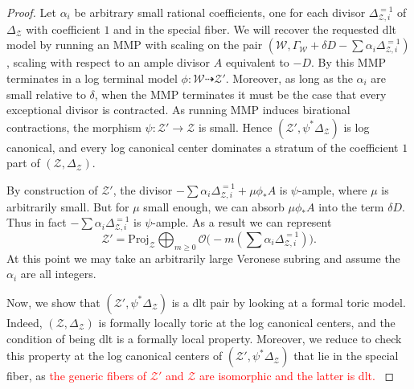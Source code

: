 \documentclass{amsart}%
\numberwithin{equation}{subsection}
\theoremstyle{plain2}
\theoremstyle{definition2}
\theoremstyle{stepstyle}
\theoremstyle{point}
\theoremstyle{subpoint}
\newcommand{\cZ}{\ensuremath{\mathscr{Z}}}
\newcommand{\cW}{\ensuremath{\mathscr{W}}}
\begin{document}
\begin{proof}
Let $\alpha_i$ be arbitrary small rational coefficients, one for each divisor $\Delta_{\cZ,i}^{=1}$ of $\Delta_\cZ$ with coefficient $1$ and in the special fiber. We will recover the requested dlt model by running an MMP with scaling on the pair $(\cW, \Gamma_\cW+\delta D - \sum \alpha_i \Delta_{\cZ,i}^{=1})$, scaling with respect to an ample divisor $A$ equivalent to $-D$. By \cite{BirkarCasciniHaconEtAl} this MMP terminates in a log terminal model $\phi \colon \cW \dashrightarrow \cZ'$. Moreover, as long as the $\alpha_i$ are small relative to $\delta$, when the MMP terminates it must be the case that every exceptional divisor is contracted.  As running MMP induces birational contractions, the morphism $\psi \colon \cZ' \to \cZ$ is small. Hence $(\cZ', \psi^*\Delta_\cZ)$ is log canonical, and every log canonical center dominates a stratum of the coefficient $1$ part of $(\cZ,\Delta_\cZ)$.

By construction of $\cZ'$, the divisor $-\sum \alpha_i \Delta_{\cZ,i}^{=1} + \mu \phi_* A$ is $\psi$-ample, where $\mu$ is arbitrarily small. But for $\mu$ small enough, we can absorb $\mu \phi_* A$ into the term $\delta D$. Thus in fact $-\sum \alpha_i \Delta_{\cZ,i}^{=1}$ is $\psi$-ample. As a result we can represent $$\cZ' = \text{Proj}_\cZ \bigoplus_{m \geqslant 0} \mathcal{O}\big(-m(\sum \alpha_i \Delta_{\cZ,i}^{=1})\big).$$ At this point we may take an arbitrarily large Veronese subring and assume the $\alpha_i$ are all integers.

Now, we show that $(\cZ', \psi^*\Delta_\cZ)$ is a dlt pair %
by looking at a formal toric model. Indeed, $(\cZ,\Delta_{\cZ})$ is formally locally toric at the log canonical centers, and the condition of being dlt is a formally local property. Moreover, we reduce to check this property at the log canonical centers of  $(\cZ', \psi^*\Delta_\cZ)$ that lie in the special fiber, as \textcolor{red}{the generic fibers of $\cZ'$ and $\cZ$ are isomorphic and the latter is dlt. } %


\end{proof}
\end{document}
